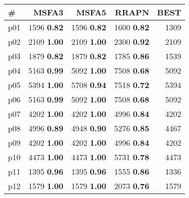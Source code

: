 \begin{tabular}{lrrrr}
\toprule
\textbf{\#} & \textbf{MSFA3} & \textbf{MSFA5} & \textbf{RRAPN} & \textbf{BEST}\\
\midrule
\multicolumn{1}{l|}{p01} & {\footnotesize 1596} \textbf{0.82} & {\footnotesize 1596} \textbf{0.82} & {\footnotesize 1600} \textbf{0.82} & \multicolumn{1}{|r}{1309}\\
\multicolumn{1}{l|}{p02} & {\footnotesize 2109} \textbf{1.00} & {\footnotesize 2109} \textbf{1.00} & {\footnotesize 2300} \textbf{0.92} & \multicolumn{1}{|r}{2109}\\
\multicolumn{1}{l|}{p03} & {\footnotesize 1879} \textbf{0.82} & {\footnotesize 1879} \textbf{0.82} & {\footnotesize 1785} \textbf{0.86} & \multicolumn{1}{|r}{1539}\\
\multicolumn{1}{l|}{p04} & {\footnotesize 5163} \textbf{0.99} & {\footnotesize 5092} \textbf{1.00} & {\footnotesize 7508} \textbf{0.68} & \multicolumn{1}{|r}{5092}\\
\multicolumn{1}{l|}{p05} & {\footnotesize 5394} \textbf{1.00} & {\footnotesize 5708} \textbf{0.94} & {\footnotesize 7518} \textbf{0.72} & \multicolumn{1}{|r}{5394}\\
\multicolumn{1}{l|}{p06} & {\footnotesize 5163} \textbf{0.99} & {\footnotesize 5092} \textbf{1.00} & {\footnotesize 7508} \textbf{0.68} & \multicolumn{1}{|r}{5092}\\
\multicolumn{1}{l|}{p07} & {\footnotesize 4202} \textbf{1.00} & {\footnotesize 4202} \textbf{1.00} & {\footnotesize 4996} \textbf{0.84} & \multicolumn{1}{|r}{4202}\\
\multicolumn{1}{l|}{p08} & {\footnotesize 4996} \textbf{0.89} & {\footnotesize 4948} \textbf{0.90} & {\footnotesize 5276} \textbf{0.85} & \multicolumn{1}{|r}{4467}\\
\multicolumn{1}{l|}{p09} & {\footnotesize 4202} \textbf{1.00} & {\footnotesize 4202} \textbf{1.00} & {\footnotesize 4996} \textbf{0.84} & \multicolumn{1}{|r}{4202}\\
\multicolumn{1}{l|}{p10} & {\footnotesize 4473} \textbf{1.00} & {\footnotesize 4473} \textbf{1.00} & {\footnotesize 5731} \textbf{0.78} & \multicolumn{1}{|r}{4473}\\
\multicolumn{1}{l|}{p11} & {\footnotesize 1395} \textbf{0.96} & {\footnotesize 1395} \textbf{0.96} & {\footnotesize 1555} \textbf{0.86} & \multicolumn{1}{|r}{1336}\\
\multicolumn{1}{l|}{p12} & {\footnotesize 1579} \textbf{1.00} & {\footnotesize 1579} \textbf{1.00} & {\footnotesize 2073} \textbf{0.76} & \multicolumn{1}{|r}{1579}\\

\end{tabular}
